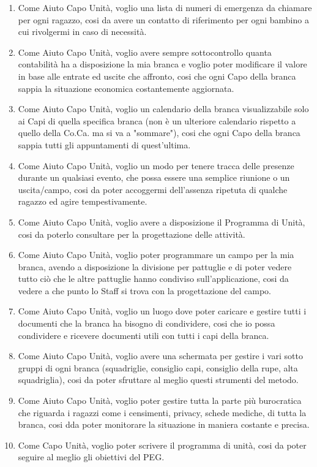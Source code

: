 \documentclass[11pt]{article}
\begin{document}
\begin{enumerate}
  \item Come Aiuto Capo Unità, voglio una lista di numeri di emergenza da chiamare per ogni ragazzo, cosi da avere un contatto di riferimento per ogni bambino a cui rivolgermi in caso di necessità.
  \item Come Aiuto Capo Unità, voglio avere sempre sottocontrollo quanta contabilità ha a disposizione la mia branca e voglio poter modificare il valore in base alle entrate ed uscite che affronto, cosi che ogni Capo della branca sappia la situazione economica costantemente aggiornata.
  \item Come Aiuto Capo Unità, voglio un calendario della branca visualizzabile solo ai Capi di quella specifica branca (non è un ulteriore calendario rispetto a quello della Co.Ca. ma si va a "sommare"), cosi che ogni Capo della branca sappia tutti gli appuntamenti di quest'ultima.
  \item Come Aiuto Capo Unità, voglio un modo per tenere tracca delle presenze durante un qualsiasi evento, che possa essere una semplice riunione o un uscita/campo, cosi da poter accoggermi dell'assenza ripetuta di qualche ragazzo ed agire tempestivamente.
  \item Come Aiuto Capo Unità, voglio avere a disposizione il Programma di Unità, cosi da poterlo consultare per la progettazione delle attività.
  \item Come Aiuto Capo Unità, voglio poter programmare un campo per la mia branca, avendo a disposizione la divisione per pattuglie e di poter vedere tutto ciò che le altre pattuglie hanno condiviso sull'applicazione, cosi da vedere a che punto lo Staff si trova con la progettazione del campo.
  \item Come Aiuto Capo Unità, voglio un luogo dove poter caricare e gestire tutti i documenti che la branca ha bisogno di condividere, cosi che io possa condividere e ricevere documenti utili con tutti i capi della branca.
  \item Come Aiuto Capo Unità, voglio avere una schermata per gestire i vari sotto gruppi di ogni branca (squadriglie, consiglio capi, consiglio della rupe, alta squadriglia), cosi da poter sfruttare al meglio questi strumenti del metodo.
  \item Come Aiuto Capo Unità, voglio poter gestire tutta la parte più burocratica che riguarda i ragazzi come i censimenti, privacy, schede mediche, di tutta la branca, cosi dda poter monitorare la situazione in maniera costante e precisa.
  \vspace{1cm}
  \item Come Capo Unità, voglio poter scrivere il programma di unità, cosi da poter seguire al meglio gli obiettivi del PEG.

\end{enumerate}
\end{document}
